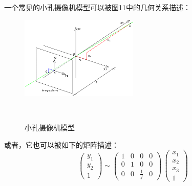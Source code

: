 一个常见的小孔摄像机模型可以被图11中的几何关系描述：\\
\begin{figure}[h!]

  \centering
    \includegraphics[width=0.5\textwidth]{../Pictures/pin.png}
    \caption{小孔摄像机模型}\\
\end{figure}
\newpage
或者，它也可以被如下的矩阵描述：
$$\begin{pmatrix} y_1 \\ y_2 \\ 1 \end{pmatrix} \sim \begin{pmatrix} 1 & 0 & 0 & 0 \\ 0 & 1 & 0 & 0 \\ 0 & 0 & \frac{1}{f} & 0 \end{pmatrix} \, \begin{pmatrix} x_1 \\ x_2 \\ x_3 \\ 1 \end{pmatrix} $$

